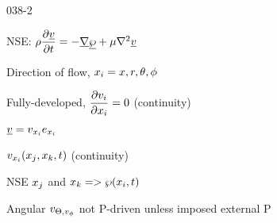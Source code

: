 \begin{mitframe}{038-2}
\begin{listone}
	\item NSE: $\dens\dfrac{\partial\uline{\vvel}}{\partial{t}}=-\gradop\uline{\dynpress}+\chempot\nabla^{2}\uline{\vvel}$
		\begin{listtwo}
        	\item Direction of flow, $\specfrac{i}=\disp,\pos,\theta,\eleccoeff$
    		 \item Fully-developed, $\dfrac{\partial\vvel_{\state}}{\partial\specfrac{i}}=0$ (continuity)
        	\item$\uline\vvel=\vvel_{\specfrac{i}}\e_{\specfrac{i}}$
        	\item $\vvel_{\specfrac{i}}(\specfrac{j},\specfrac{k},t)$ (continuity)
        \item NSE $\specfrac{j}$ and $\specfrac{k}=>\dynpress(\specfrac{i},t)$
        			\begin{listthree}        
                    	\item Angular $\vvel_{\dimltemp,\vvel_{\eleccoeff}}$ not P-driven unless imposed external P
                    \end{listthree}
\end{listtwo}
\end{listone}
\end{mitframe}